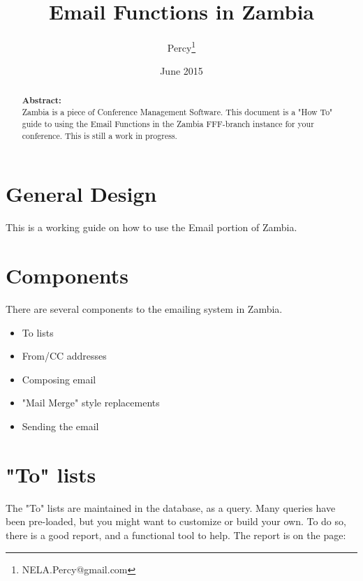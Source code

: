 \documentclass[captions=tablesignature]{scrartcl}
\author{Percy\thanks{NELA.Percy@gmail.com}}
\date{June 2015}
\title{Email Functions in Zambia}
\begin{document}
\maketitle
{}
\thispagestyle{fancy}
\renewcommand{\headrulewidth}{0pt}
\renewcommand{\footrulewidth}{0pt}
\lhead{}
\rhead{}
\chead{}
\lfoot{}
\cfoot{}
\rfoot{}
\begin{abstract}
\vspace{5cm}
{\LARGE{\textbf{Abstract:\\}}}
Zambia is a piece of Conference Management Software.  This document is a "How To" guide to using the Email Functions in the Zambia FFF-branch instance for your conference.  This is still a work in progress.
\end{abstract}
\newpage
\renewcommand{\headrulewidth}{1pt}
\renewcommand{\footrulewidth}{1pt}
\rfoot{\thepage}
\setcounter{tocdepth}{2}
\tableofcontents
\newpage
{}
\section{General Design}
\label{sec-1}

This is a working guide on how to use the Email portion of Zambia.

\section{Components}
\label{sec-2}

There are several components to the emailing system in Zambia.
\begin{itemize}
\item To lists
\item From/CC addresses
\item Composing email
\item "Mail Merge" style replacements
\item Sending the email
\end{itemize}

\section{"To" lists}
\label{sec-3}

The "To" lists are maintained in the database, as a query.  Many
queries have been pre-loaded, but you might want to customize or
build your own.  To do so, there is a good report, and a functional
tool to help.  The report is on the page:
\end{document}
